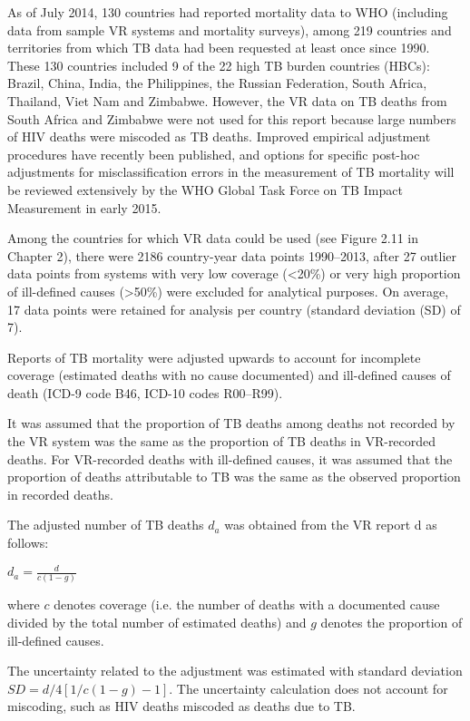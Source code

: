 As of July 2014, 130 countries had reported mortality data to WHO (including data from sample VR systems and mortality surveys), among 219 countries and territories from which TB data had been requested at least once since 1990. These 130 countries included 9 of the 22 high TB burden countries (HBCs): Brazil, China, India, the Philippines, the Russian Federation, South Africa, Thailand, Viet Nam and Zimbabwe. However, the VR data on TB deaths from South Africa and Zimbabwe were not used for this report because large numbers of HIV deaths were miscoded as TB deaths. Improved empirical adjustment procedures have recently been published\cite{21479092}, and options for specific post-hoc adjustments for misclassification errors in the measurement of TB mortality will be reviewed extensively by the WHO Global Task Force on TB Impact Measurement in early 2015. 

Among the countries for which VR data could be used (see Figure 2.11 in Chapter 2), there were 2186 country-year data points 1990–2013, after 27 outlier data points from systems with very low coverage (<20\%) or very high proportion of ill-defined causes (>50\%) were excluded for analytical purposes. On average, 17 data points were retained for analysis per country (standard deviation (SD) of 7). 

Reports of TB mortality were adjusted upwards to account for incomplete coverage (estimated deaths with no cause documented) and ill-defined causes of death (ICD-9 code B46, ICD-10 codes R00–R99).\cite{15798840}

It was assumed that the proportion of TB deaths among deaths not recorded by the VR system was the same as the proportion of TB deaths in VR-recorded deaths. For VR-recorded deaths with ill-defined causes, it was assumed that the proportion of deaths attributable to TB was the same as the observed proportion in recorded deaths. 

The adjusted number of TB deaths $d_a$ was obtained from the VR report d as follows:

$d_a = \frac{d}{c(1-g)}$

where $c$ denotes coverage (i.e. the number of deaths with a documented cause divided by the total number of estimated deaths) and $g$ denotes the proportion of ill-defined causes.

The uncertainty related to the adjustment was estimated with standard deviation $SD=d/4 [1/c(1-g) -1]$. The uncertainty calculation does not account for miscoding, such as HIV deaths miscoded as deaths due to TB. 

